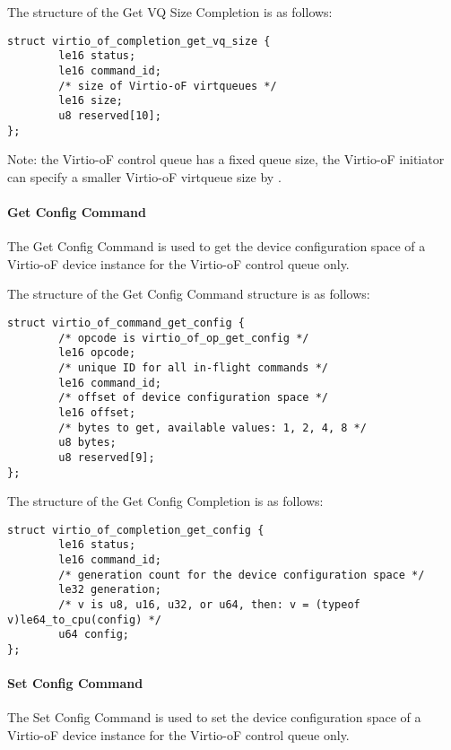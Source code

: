 The structure of the Get VQ Size Completion is as follows:
\begin{lstlisting}
struct virtio_of_completion_get_vq_size {
        le16 status;
        le16 command_id;
        /* size of Virtio-oF virtqueues */
        le16 size;
        u8 reserved[10];
};
\end{lstlisting}

Note: the Virtio-oF control queue has a fixed queue size, the Virtio-oF initiator can specify a smaller Virtio-oF virtqueue size by
.

\paragraph{Get Config Command}\label{sec:Virtio Transport Options / Virtio Over Fabrics / Commands Definition / Opcodes / Get Config Command}
The Get Config Command is used to get the device configuration space of a Virtio-oF device instance for the Virtio-oF control queue only.

The structure of the Get Config Command structure is as follows:
\begin{lstlisting}
struct virtio_of_command_get_config {
        /* opcode is virtio_of_op_get_config */
        le16 opcode;
        /* unique ID for all in-flight commands */
        le16 command_id;
        /* offset of device configuration space */
        le16 offset;
        /* bytes to get, available values: 1, 2, 4, 8 */
        u8 bytes;
        u8 reserved[9];
};
\end{lstlisting}

The structure of the Get Config Completion is as follows:
\begin{lstlisting}
struct virtio_of_completion_get_config {
        le16 status;
        le16 command_id;
        /* generation count for the device configuration space */
        le32 generation;
        /* v is u8, u16, u32, or u64, then: v = (typeof v)le64_to_cpu(config) */
        u64 config;
};
\end{lstlisting}

\paragraph{Set Config Command}\label{sec:Virtio Transport Options / Virtio Over Fabrics / Commands Definition / Opcodes / Set Config Command}
The Set Config Command is used to set the device configuration space of a Virtio-oF device instance for the Virtio-oF control queue only.

